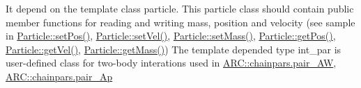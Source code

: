 It depend on the template class particle. This particle class should contain public member functions for reading and writing mass, position and velocity (see sample in \hyperlink{classParticle_a97d76b66aed57834c105b78b10643b81}{Particle\+::set\+Pos()}, \hyperlink{classParticle_a07c405254ac3f03854e7523ff473c828}{Particle\+::set\+Vel()}, \hyperlink{classParticle_a620f479862b90468a77da4e9cf5c0ff5}{Particle\+::set\+Mass()}, \hyperlink{classParticle_a4ec76421cddd91b1f27357fb182f6923}{Particle\+::get\+Pos()}, \hyperlink{classParticle_ab3d63df7f8c22f232b096ae33b6ea3ac}{Particle\+::get\+Vel()}, \hyperlink{classParticle_a2576aff503f68e78ced91406512b1255}{Particle\+::get\+Mass()}) The template depended type int\+\_\+par is user-\/defined class for two-\/body interations used in \hyperlink{classARC_1_1chainpars_a766866c2e38b475767a4f8529624a378}{A\+R\+C\+::chainpars.\+pair\+\_\+\+AW}, \hyperlink{classARC_1_1chainpars_aa34d083090c50f572d2126262e169474}{A\+R\+C\+::chainpars.\+pair\+\_\+\+Ap}

